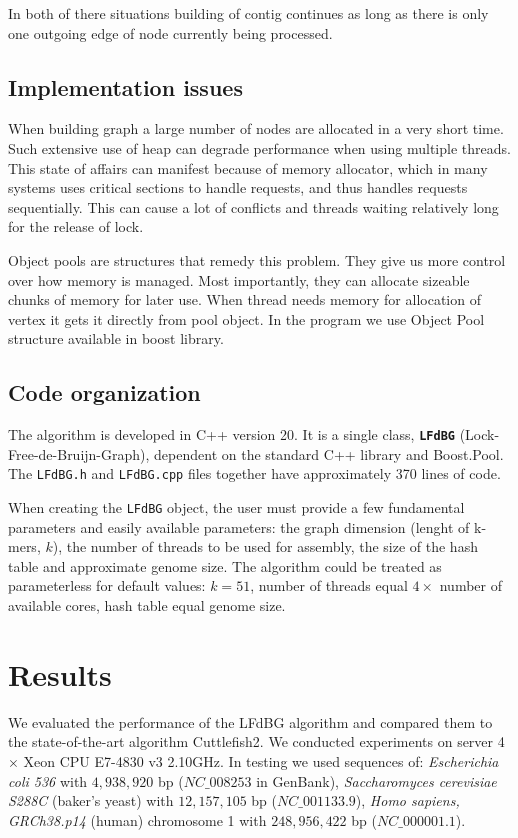 \documentclass[12pt]{article}
\begin{document}
In both of there situations building of contig continues as long as there is only one outgoing edge of node currently being processed.

\subsection{Implementation issues}

When building graph a large number of nodes are allocated in a very short time. Such extensive use of heap can degrade performance when using multiple threads. This state of affairs can manifest because of memory allocator, which in many systems uses critical sections to handle requests, and thus handles requests sequentially. This can cause a lot of conflicts and threads waiting relatively long for the release of lock.

Object pools are structures that remedy this problem. They give us more control over how memory is managed. Most importantly, they can allocate sizeable chunks of memory for later use. When thread needs memory for allocation of vertex it gets it directly from pool object. In the program we use Object Pool structure available in boost library.


\subsection{Code organization}

The algorithm is developed in C++ version 20. It is a single class, \textbf{\texttt{LFdBG}} (Lock-Free-de-Bruijn-Graph), dependent on the standard C++ library and Boost.Pool\cite{schaling2011boost}. The \texttt{LFdBG.h} and \texttt{LFdBG.cpp} files together have approximately 370 lines of code.

When creating the \texttt{LFdBG} object, the user must provide a few fundamental parameters and easily available parameters: the graph dimension (lenght of k-mers, $k$), the number of threads to be used for assembly, the size of the hash table and approximate genome size.
The algorithm could be treated as parameterless for default values: $k=51$, number of threads equal $4 \times$ number of available cores, hash table equal genome size.


\section{Results}

We evaluated the performance of the LFdBG algorithm and compared them to the state-of-the-art algorithm Cuttlefish2\cite{10.1093/bioinformatics/btab309}.
We conducted experiments on server 4 $\times$ Xeon CPU E7-4830 v3 \@ 2.10GHz.
In testing we used sequences of:
\textit{Escherichia coli 536}  with $4,938,920$ bp ($NC\_008253$ in GenBank\cite{benson2000genbank}),
\textit{Saccharomyces cerevisiae S288C} (baker's yeast) with $12,157,105$ bp ($NC\_001133.9$\cite{benson2000genbank}),
\textit{Homo sapiens, GRCh38.p14} (human) chromosome 1 with $248,956,422$ bp ($NC\_000001.1$\cite{benson2000genbank}).
\end{document}
